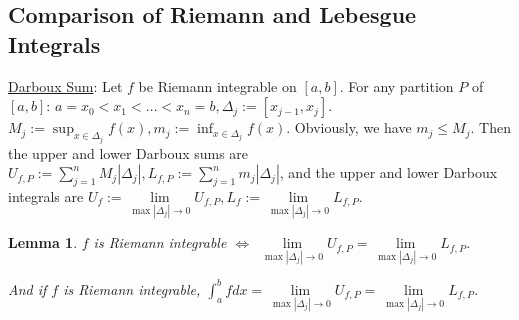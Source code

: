 \documentclass[12pt]{article}
\theoremstyle{blueplain}
\newtheorem{lemma}[theorem]{Lemma}
\theoremstyle{bluedef}
\theoremstyle{blueremark}
\numberwithin{equation}{section}
\begin{document}
\clearpage

\subsection{Comparison of Riemann and Lebesgue Integrals}

\underline{Darboux Sum}: Let $f$ be Riemann integrable on $[a,b]$. For any partition $P$ of $[a,b]$: $a = x_0 < x_1 < \ldots < x_n = b, \Delta_j := [x_{j-1}, x_j]$. $M_j := \sup_{x \in \Delta_j} f(x), m_j := \inf_{x \in \Delta_j} f(x)$. Obviously, we have $m_j \leq M_j$. Then the upper and lower Darboux sums are $U_{f,P} := \sum_{j=1}^n M_j |\Delta_j|, L_{f,P} := \sum_{j=1}^n m_j |\Delta_j|$, and the upper and lower Darboux integrals are $U_{f} := \lim\limits_{\max |\Delta_j| \rightarrow 0} U_{f,P}, L_{f} := \lim\limits_{\max |\Delta_j| \rightarrow 0} L_{f,P}$.

\begin{lemma}
  $f$ is Riemann integrable $\iff$ $\lim\limits_{\max |\Delta_j| \rightarrow 0} U_{f,P} = \lim\limits_{\max |\Delta_j| \rightarrow 0} L_{f,P}$.

  And if $f$ is Riemann integrable, $\int_a^b f dx = \lim\limits_{\max |\Delta_j| \rightarrow 0} U_{f,P} = \lim\limits_{\max |\Delta_j| \rightarrow 0} L_{f,P}$.
\end{lemma}
\end{document}

